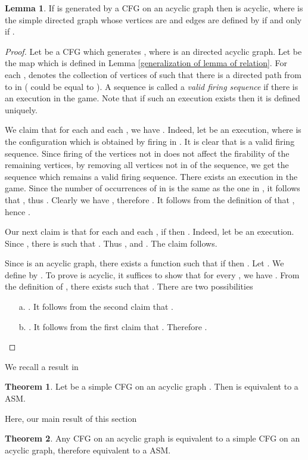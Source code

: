 \documentclass{article}
\theoremstyle{definition}
\newtheorem{lem}{Lemma}
\newtheorem{theo}{Theorem}
\begin{document}
\begin{lem}
\label{CFGs on acyclic graphs}
If  is generated by a CFG on an acyclic graph then  is acyclic, where  is the simple directed graph whose vertices are  and edges are defined by  if and only if .
\end{lem}
\begin{proof}
Let  be a CFG which generates , where  is an directed acyclic graph. Let  be the map which is defined in Lemma \ref{generalization of lemma of relation}. For each ,  denotes the collection of vertices  of  such that  there is a directed path from  to  in  ( could be equal to ). A sequence  is called a \emph{valid firing sequence} if there is an execution  in the game. Note that if such an execution exists then it is defined uniquely. 

We claim that for each  and each , we have . Indeed, let  be an execution, where  is the configuration which is obtained by firing  in . It is clear that  is a valid firing sequence. Since firing of the vertices not in  does not affect the firability of the remaining vertices, by removing all vertices not in  of the sequence, we get the sequence  which remains a valid firing sequence. There exists an execution  in the game. Since the number of occurrences of  in  is the same as the one in , it follows that , thus . Clearly we have , therefore . It follows from the definition of   that , hence .

Our next claim is that for each  and each , if  then . Indeed, let  be an execution. Since , there is  such that . Thus , and . The claim follows.

Since  is an acyclic graph, there exists a function  such that if  then . Let . We define  by . To prove  is acyclic, it suffices to show that for every , we have . From the definition of , there exists  such that . There are two possibilities
\begin{itemize}
  \item[a. ] .  It follows from the second claim that . 
  \item[b. ] . It follows from the first claim that .  Therefore .
\end{itemize}  
\end{proof}
We recall a result in \cite{Mag03}
\begin{theo}
\label{theorem of Magnien}\cite{Mag03} 
Let  be a simple CFG on an acyclic graph . Then  is equivalent to a ASM.
\end{theo}
Here, our main result of this section
\begin{theo}
\label{CFGs on acyclic graph including in ASM}
Any CFG on an acyclic graph is equivalent to a simple CFG on an acyclic graph, therefore equivalent to a ASM.
\end{theo}
\end{document}
